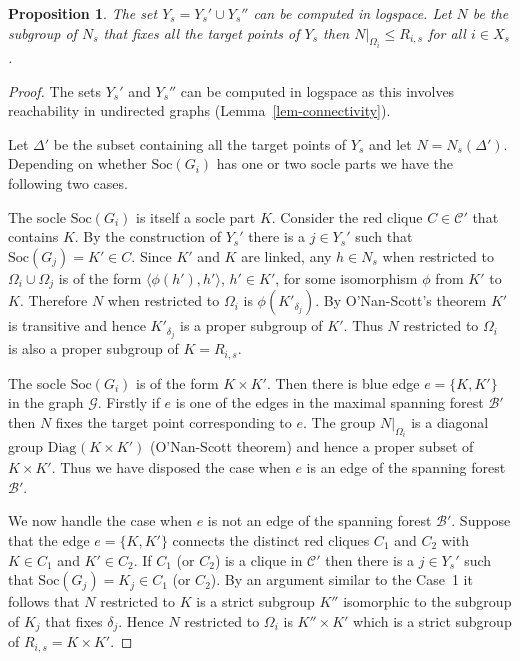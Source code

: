 \documentclass[11pt]{madras}%
\newtheorem{proposition}[theorem]{Proposition}
\theoremstyle{remark}
\newcommand{\pr}[2]{{\ensuremath{\left.{#1}\right\vert_{#2}}}}
\newcommand{\Soc}[1]{{\ensuremath{\mathrm{Soc}\left(#1\right)}}}
\newcommand{\pointwise}[2]{{\ensuremath{#1\left(#2\right)}}}
\newcommand{\Diag}[2][]{{\ensuremath{\mathrm{Diag}_{{#1}}\left(#2\right)}}}
\begin{document}
\begin{proposition}\label{prop-critical-nonab}
  The set $Y_s = Y_s' \cup Y_s''$ can be computed in logspace. Let $N$
  be the subgroup of $N_s$ that fixes all the target points of $Y_s$
  then $\pr{N}{\Omega_i} \leq R_{i,s}$ for all $i \in X_s$.
\end{proposition}
\begin{proof}
  The sets $Y_s'$ and $Y_s''$ can be computed in logspace as this
  involves reachability in undirected graphs
  (Lemma~\ref{lem-connectivity}).

  Let $\Delta'$ be the subset containing all the target points of
  $Y_s$ and let $N = \pointwise{N_s}{\Delta'}$.  Depending on whether
  $\Soc{G_i}$ has one or two socle parts we have the following two
  cases.\newline

   The socle $\Soc{G_i}$ is itself a socle part
  $K$. Consider the red clique $C \in \mathcal{C}'$ that contains $K$.
  By the construction of $Y_s'$ there is a $j \in Y_s'$ such that
  $\Soc{G_j} = K' \in C$.  Since $K'$ and $K$ are linked, any $h \in
  N_s$ when restricted to $\Omega_i \cup \Omega_j$ is of the form
  $\langle \phi(h') ,h' \rangle $, $h' \in K'$, for some isomorphism
  $\phi$ from $K'$ to $K$. Therefore $N$ when restricted to $\Omega_i$
  is $\phi(K'_{\delta_j})$. By O'Nan-Scott's theorem $K'$ is
  transitive and hence $K'_{\delta_j}$ is a proper subgroup of $K'$.
  Thus $N$ restricted to $\Omega_i$ is also a proper subgroup of $K =
  R_{i,s}$.  \newline

   The socle $\Soc{G_i}$ is of the form $K
  \times K'$. Then there is blue edge $e = \{ K , K'\}$ in the graph
  $\mathcal{G}$.  Firstly if $e$ is one of the edges in the maximal
  spanning forest $\mathcal{B}'$ then $N$ fixes the target point
  corresponding to $e$. The group $\pr{N}{\Omega_i}$ is a diagonal
  group $\Diag{K \times K'}$ (O'Nan-Scott theorem) and hence a proper
  subset of $K \times K'$.  Thus we have disposed the case when $e$ is
  an edge of the spanning forest $\mathcal{B}'$.

  We now handle the case when $e$ is not an edge of the spanning
  forest $\mathcal{B}'$. Suppose that the edge $e = \{ K,K'\}$
  connects the distinct red cliques $C_1$ and $C_2$ with $K \in C_1$
  and $K' \in C_2$.  If $C_1$ (or $C_2$) is a clique in $\mathcal{C}'$
  then there is a $j \in Y_s'$ such that $\Soc{G_j} = K_j \in C_1$ (or
  $C_2$).  By an argument similar to the Case~1 it follows that $N$
  restricted to $K$ is a strict subgroup $K''$ isomorphic to the
  subgroup of $K_j$ that fixes $\delta_j$.  Hence $N$ restricted to
  $\Omega_i$ is $K''\times K'$ which is a strict subgroup of $R_{i,s}
  = K \times K'$.


\end{proof}
\end{document}
